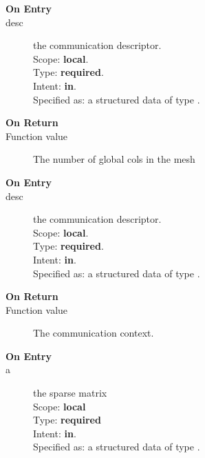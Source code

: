\begin{description}
\item[\bf On Entry]
\item[desc] the communication descriptor.\\
Scope: {\bf local}.\\
Type: {\bf required}.\\
Intent: {\bf in}.\\
Specified as: a structured data of type \descdata.
\end{description}

\begin{description}
\item[\bf On Return]
\item[Function value] The number of global cols in the mesh
\end{description}



\begin{description}
\item[\bf On Entry]
\item[desc] the communication descriptor.\\
Scope: {\bf local}.\\
Type: {\bf required}.\\
Intent: {\bf in}.\\
Specified as: a structured data of type \descdata.
\end{description}

\begin{description}
\item[\bf On Return]
\item[Function value] The communication context.
\end{description}





\begin{description}
\item[\bf On Entry]
\item[a] the sparse matrix\\
Scope: {\bf local}\\
Type: {\bf required}\\
Intent: {\bf in}.\\
Specified as: a structured data of type \spdata.
\end{description}

